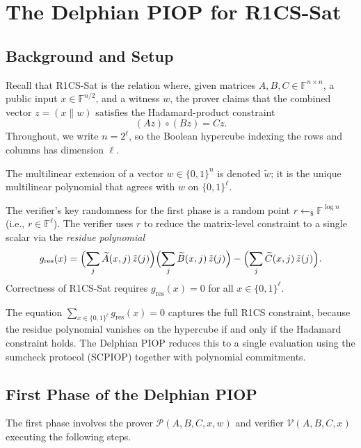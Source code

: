 \documentclass[11pt]{article}
\theoremstyle{plain}
\theoremstyle{definition}
\newcommand{\F}{\mathbb{F}}
\newcommand{\tildew}{\tilde{w}}
\newcommand{\tildeA}{\widetilde{A}}
\newcommand{\tildeB}{\widetilde{B}}
\newcommand{\tildeC}{\widetilde{C}}
\newcommand{\tildez}{\tilde{z}}
\begin{document}
\section{The Delphian PIOP for R1CS-Sat}

\subsection{Background and Setup}

Recall that R1CS-Sat is the relation where, given matrices $A, B, C \in \F^{n \times n}$, a
public input $x \in \F^{n/2}$, and a witness $w$, the prover claims that the combined vector
$z = (x \| w)$ satisfies the Hadamard-product constraint
\[
  (Az) \circ (Bz) = Cz.
\]
Throughout, we write $n = 2^\ell$, so the Boolean hypercube indexing the rows and columns
has dimension $\ell$.

The multilinear extension of a vector $w \in \{0,1\}^n$ is denoted $\tildew$; it is the
unique multilinear polynomial that agrees with $w$ on $\{0,1\}^\ell$.

\medskip
The verifier's key randomness for the first phase is a random point
$r \leftarrow_\$ \F^{\log n}$ (i.e., $r \in \F^\ell$).  The verifier uses $r$ to reduce
the matrix-level constraint to a single scalar via the \emph{residue polynomial}
\[
  g_{\mathrm{res}}(x)
  =
  \Bigl(\sum_{j} \tildeA(x,j)\,\tildez(j)\Bigr)
  \Bigl(\sum_{j} \tildeB(x,j)\,\tildez(j)\Bigr)
  -
  \Bigl(\sum_{j} \tildeC(x,j)\,\tildez(j)\Bigr).
\]
Correctness of R1CS-Sat requires $g_{\mathrm{res}}(x) = 0$ for all $x \in \{0,1\}^\ell$.

\begin{importantbox}
  The equation $\sum_{x \in \{0,1\}^\ell} g_{\mathrm{res}}(x) = 0$ captures the full R1CS
  constraint, because the residue polynomial vanishes on the hypercube if and only if the
  Hadamard constraint holds.  The Delphian PIOP reduces this to a single evaluation using the
  sumcheck protocol (SCPIOP) together with polynomial commitments.
\end{importantbox}

\subsection{First Phase of the Delphian PIOP}

The first phase involves the prover $\mathcal{P}(A,B,C,x,w)$ and verifier
$\mathcal{V}(A,B,C,x)$ executing the following steps.
\end{document}
